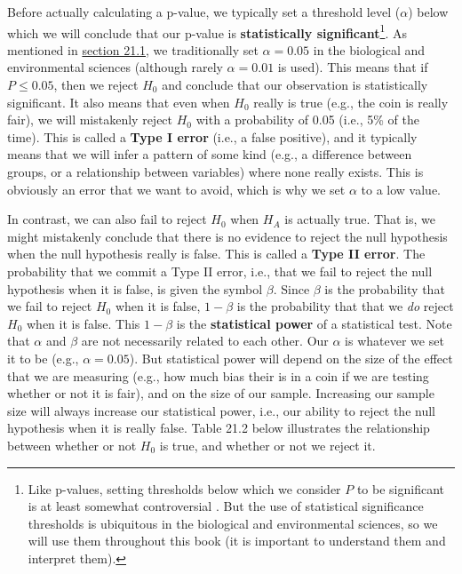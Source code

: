 \documentclass[
  openany]{krantz}
\begin{document}
Before actually calculating a p-value, we typically set a threshold level (\(\alpha\)) below which we will conclude that our p-value is \textbf{statistically significant}\footnote{Like p-values, setting thresholds below which we consider \(P\) to be significant is at least somewhat controversial \citep{McShane2019, Mayo2021}. But the use of statistical significance thresholds is ubiquitous in the biological and environmental sciences, so we will use them throughout this book (it is important to understand them and interpret them).}.
As mentioned in \protect\hyperlink{how-ridiculous-is-our-hypothesis}{section 21.1}, we traditionally set \(\alpha= 0.05\) in the biological and environmental sciences (although rarely \(\alpha = 0.01\) is used).
This means that if \(P \leq 0.05\), then we reject \(H_{0}\) and conclude that our observation is statistically significant.
It also means that even when \(H_{0}\) really is true (e.g., the coin is really fair), we will mistakenly reject \(H_{0}\) with a probability of 0.05 (i.e., 5\% of the time).
This is called a \textbf{Type I error} (i.e., a false positive), and it typically means that we will infer a pattern of some kind (e.g., a difference between groups, or a relationship between variables) where none really exists.
This is obviously an error that we want to avoid, which is why we set \(\alpha\) to a low value.

In contrast, we can also fail to reject \(H_{0}\) when \(H_{A}\) is actually true.
That is, we might mistakenly conclude that there is no evidence to reject the null hypothesis when the null hypothesis really is false.
This is called a \textbf{Type II error}.
The probability that we commit a Type II error, i.e., that we fail to reject the null hypothesis when it is false, is given the symbol \(\beta\).
Since \(\beta\) is the probability that we fail to reject \(H_{0}\) when it is false, \(1 - \beta\) is the probability that that we \emph{do} reject \(H_{0}\) when it is false.
This \(1 - \beta\) is the \textbf{statistical power} of a statistical test.
Note that \(\alpha\) and \(\beta\) are not necessarily related to each other.
Our \(\alpha\) is whatever we set it to be (e.g., \(\alpha = 0.05\)).
But statistical power will depend on the size of the effect that we are measuring (e.g., how much bias their is in a coin if we are testing whether or not it is fair), and on the size of our sample.
Increasing our sample size will always increase our statistical power, i.e., our ability to reject the null hypothesis when it is really false.
Table 21.2 below illustrates the relationship between whether or not \(H_{0}\) is true, and whether or not we reject it.
\end{document}
